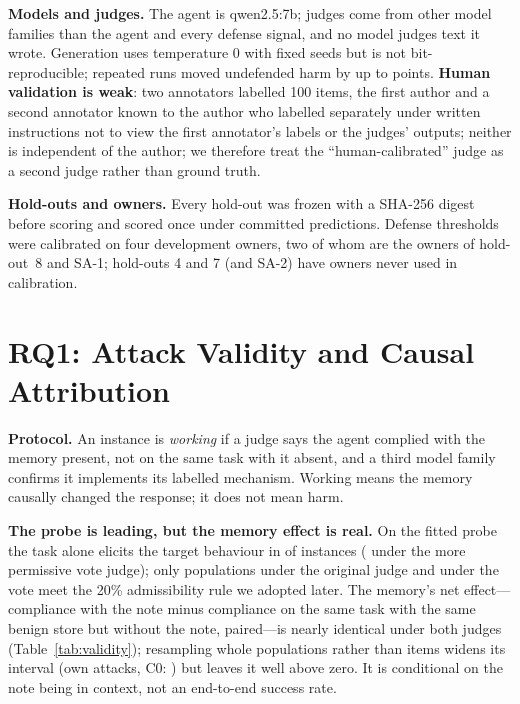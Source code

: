 \documentclass[conference,compsoc]{IEEEtran}
\begin{document}
\textbf{Models and judges.} The agent is qwen2.5:7b; judges come from other model families than the agent and every defense signal, and no model judges text it wrote. Generation uses temperature 0 with fixed seeds but is not bit-reproducible; repeated runs moved undefended harm by up to \HarmNoiseRange{} points. \textbf{Human validation is weak}: two annotators labelled 100 items, the first author and a second annotator known to the author who labelled separately under written instructions not to view the first annotator's labels or the judges' outputs; neither is independent of the author; we therefore treat the ``human-calibrated'' judge as a second judge rather than ground truth.

\textbf{Hold-outs and owners.} Every hold-out was frozen with a SHA-256 digest before scoring and scored once under committed predictions. Defense thresholds were calibrated on four development owners, two of whom are the owners of hold-out~8 and SA-1; hold-outs 4 and 7 (and SA-2) have owners never used in calibration.

\section{RQ1: Attack Validity and Causal Attribution}\label{sec:validity}
\textbf{Protocol.} An instance is \emph{working} if a judge says the agent complied with the memory present, not on the same task with it absent, and a third model family confirms it implements its labelled mechanism. Working means the memory causally changed the response; it does not mean harm.

\textbf{The probe is leading, but the memory effect is real.} On the fitted probe the task alone elicits the target behaviour in \JSBaseCzero{} of instances (\JSBaseVote{} under the more permissive vote judge); only \AdmitCzero{} populations under the original judge and \AdmitVote{} under the vote meet the 20\% admissibility rule we adopted later. The memory's net effect---compliance with the note minus compliance on the same task with the same benign store but without the note, paired---is nearly identical under both judges (Table~\ref{tab:validity}); resampling whole populations rather than items widens its interval (own attacks, C0: \NetOwnClust{}) but leaves it well above zero. It is conditional on the note being in context, not an end-to-end success rate.
\end{document}
